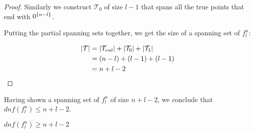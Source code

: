 \begin{proof}
Similarly we construct $\mathcal{T}_0$ of size $l-1$
that spans all the true points
that end with $0^{\{n-l\}}$.

Putting the partial spanning sets together,
we get the size of a spanning set of $f_l^n$:

\begin{align*}
\lvert\mathcal{T}\rvert
&= \lvert\mathcal{T}_{\mathit{out}}\rvert
+ \lvert\mathcal{T}_0\rvert + \lvert\mathcal{T}_1\rvert \\
&= (n-l) + (l-1) + (l-1) \\
&= n + l - 2
\end{align*}
\end{proof}

Having shown a spanning set of $f_l^n$ of size $n+l-2$,
we conclude that $dnf(f_l^n) \leq n+l-2$.

\begin{lemma}
$dnf(f_l^n) \geq n+l-2$
\end{lemma}

